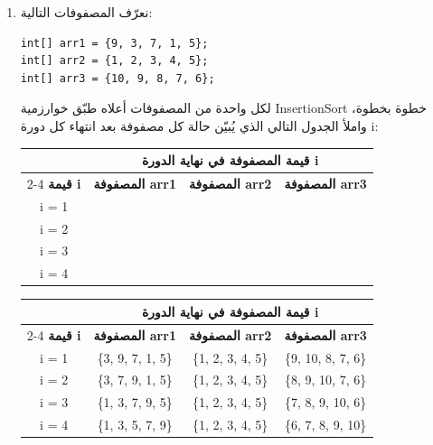 \documentclass[14pt]{extarticle}
\begin{document}
\begin{enumerate}[itemsep=3em]
    \item نعرّف المصفوفات التالية:
\begin{english}
\begin{boxCode}
\begin{verbatim}
int[] arr1 = {9, 3, 7, 1, 5};
int[] arr2 = {1, 2, 3, 4, 5};
int[] arr3 = {10, 9, 8, 7, 6};
\end{verbatim}
\end{boxCode}
\end{english}
لكل واحدة من المصفوفات أعلاه طبّق خوارزمية \textenglish{InsertionSort}
 خطوة بخطوة، واملأ الجدول التالي الذي يُبيّن حالة كل مصفوفة بعد انتهاء كل دورة \textenglish{i}:

\begin{center}
\begin{tabular}{|c|c|c|c|}
\hline
 & \multicolumn{3}{c|}{\textbf{قيمة المصفوفة في نهاية الدورة \textenglish{i}}} \\
\cline{2-4}
\textbf{قيمة \textenglish{i}} & \textbf{المصفوفة \textenglish{arr1}} & \textbf{المصفوفة \textenglish{arr2}} & \textbf{المصفوفة \textenglish{arr3}} \\
\hline
\textenglish{i = 1} & \hspace{3.5cm} & \hspace{3.5cm} & \hspace{3.5cm} \\[15pt]
\hline
\textenglish{i = 2} & & & \\[15pt]
\hline
\textenglish{i = 3} & & & \\[15pt]
\hline
\textenglish{i = 4} & & & \\[15pt]
\hline
\end{tabular}
\end{center}

\ifwithsols
\begin{boxSolution}
\begin{center}
\renewcommand{\arraystretch}{1.5}
\begin{tabular}{|c|c|c|c|}
\hline
 & \multicolumn{3}{c|}{\textbf{قيمة المصفوفة في نهاية الدورة \textenglish{i}}} \\
\cline{2-4}
\textbf{قيمة \textenglish{i}} & \textbf{المصفوفة \textenglish{arr1}} & \textbf{المصفوفة \textenglish{arr2}} & \textbf{المصفوفة \textenglish{arr3}} \\
\hline
\textenglish{i = 1} & \textenglish{\{3, 9, 7, 1, 5\}} & \textenglish{\{1, 2, 3, 4, 5\}} & \textenglish{\{9, 10, 8, 7, 6\}} \\
\hline
\textenglish{i = 2} & \textenglish{\{3, 7, 9, 1, 5\}} & \textenglish{\{1, 2, 3, 4, 5\}} & \textenglish{\{8, 9, 10, 7, 6\}} \\
\hline
\textenglish{i = 3} & \textenglish{\{1, 3, 7, 9, 5\}} & \textenglish{\{1, 2, 3, 4, 5\}} & \textenglish{\{7, 8, 9, 10, 6\}} \\
\hline
\textenglish{i = 4} & \textenglish{\{1, 3, 5, 7, 9\}} & \textenglish{\{1, 2, 3, 4, 5\}} & \textenglish{\{6, 7, 8, 9, 10\}} \\
\hline
\end{tabular}
\end{center}
\end{boxSolution}
\clearpage
\fi


\end{enumerate}
\end{document}
